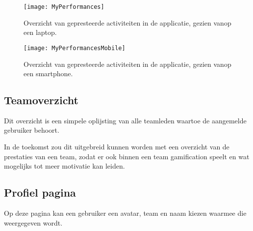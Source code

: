 \begin{figure}[h]
    \caption[Overzicht activiteiten website]{Overzicht van gepresteerde activiteiten in de applicatie, gezien vanop een laptop.}
    \texttt{[image: MyPerformances]}
    \label{fig:performances}
\end{figure}

\begin{figure}[h]
    \caption[Overzicht activiteiten website smartphone]{Overzicht van gepresteerde activiteiten in de applicatie, gezien vanop een smartphone.}
    \texttt{[image: MyPerformancesMobile]}
    \label{fig:performancesMobile}
\end{figure}

\subsection{Teamoverzicht}

Dit overzicht is een simpele oplijsting van alle teamleden waartoe de aangemelde gebruiker behoort.

In de toekomst zou dit uitgebreid kunnen worden met een overzicht van de prestaties van een team, zodat er ook binnen een team gamification speelt en wat mogelijks tot meer motivatie kan leiden.

\subsection{Profiel pagina}

Op deze pagina kan een gebruiker een avatar, team en naam kiezen waarmee die weergegeven wordt.